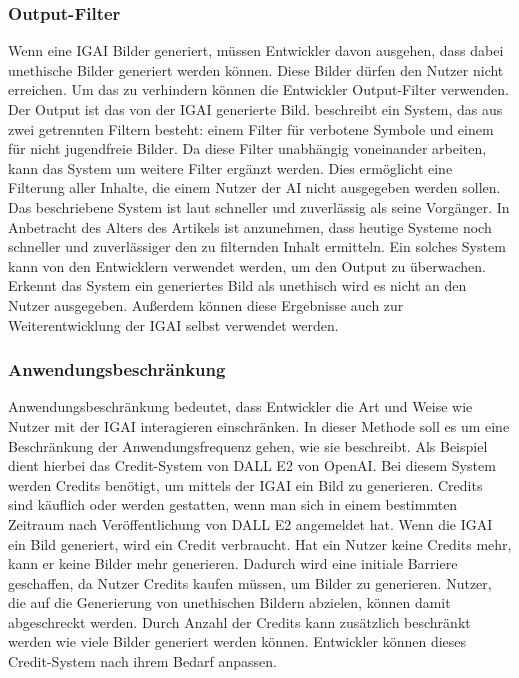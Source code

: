 \documentclass[12pt]{report}
\begin{document}
\subsubsection{Output-Filter}
Wenn eine IGAI Bilder generiert, müssen Entwickler davon ausgehen, dass dabei unethische Bilder generiert werden können. Diese Bilder dürfen den Nutzer nicht erreichen. Um das zu verhindern können die Entwickler Output-Filter verwenden. Der Output ist das von der IGAI generierte Bild. \cite{Zheng} beschreibt ein System, das aus zwei getrennten Filtern besteht: einem Filter für verbotene Symbole und einem für nicht jugendfreie Bilder. Da diese Filter unabhängig voneinander arbeiten, kann das System um weitere Filter ergänzt werden. Dies ermöglicht eine Filterung aller Inhalte, die einem Nutzer der AI nicht ausgegeben werden sollen. Das beschriebene System ist laut \cite{Zheng} schneller und zuverlässig als seine Vorgänger. In Anbetracht des Alters des Artikels ist anzunehmen, dass heutige Systeme noch schneller und zuverlässiger den zu filternden Inhalt ermitteln. Ein solches System kann von den Entwicklern verwendet werden, um den Output zu überwachen. Erkennt das System ein generiertes Bild als unethisch wird es nicht an den Nutzer ausgegeben. Außerdem können diese Ergebnisse auch zur Weiterentwicklung der IGAI selbst verwendet werden.

\subsubsection{Anwendungsbeschränkung} %
Anwendungsbeschränkung bedeutet, dass Entwickler die Art und Weise wie Nutzer mit der IGAI interagieren einschränken. In dieser Methode soll es um eine Beschränkung der Anwendungsfrequenz gehen, wie sie \cite{Jang} beschreibt. Als Beispiel dient hierbei das Credit-System von DALL E2 von OpenAI. Bei diesem System werden Credits benötigt, um mittels der IGAI ein Bild zu generieren. Credits sind käuflich oder werden gestatten, wenn man sich in einem bestimmten Zeitraum nach Veröffentlichung von DALL E2 angemeldet hat. Wenn die IGAI ein Bild generiert, wird ein Credit verbraucht. Hat ein Nutzer keine Credits mehr, kann er keine Bilder mehr generieren. Dadurch wird eine initiale Barriere geschaffen, da Nutzer Credits kaufen müssen, um Bilder zu generieren. Nutzer, die auf die Generierung von unethischen Bildern abzielen, können damit abgeschreckt werden. Durch Anzahl der Credits kann zusätzlich beschränkt werden wie viele Bilder generiert werden können. Entwickler können dieses Credit-System nach ihrem Bedarf anpassen.
\end{document}
